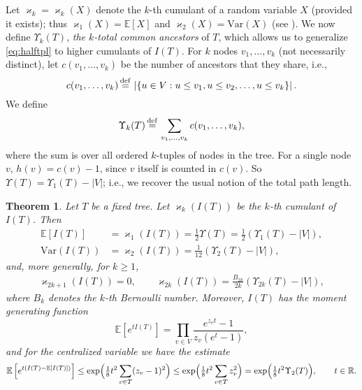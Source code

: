 \documentclass[11pt]{article}
\newcommand{\E}[1]{\mathbb{E} \left[#1\right]}
\newcommand{\Va}[1]{{\mathrm{Var}}\left(#1\right)}
\def\R{\mathbb{R}}
\def\U{\Upsilon}
\newtheorem{theorem}{Theorem}
\numberwithin{theorem}{section}
\theoremstyle{definition}
\newcommand{\eqd}{\,{\buildrel {\mathrm{def}} \over =}\,}
\numberwithin{equation}{section}
\newcommand\kk{\varkappa}
\newcommand\xpar[1]{(#1)}
\newcommand\bigpar[1]{\bigl(#1\bigr)}
\newcommand\Bigpar[1]{\Bigl(#1\Bigr)}
\begin{document}
Let $\kk_k=\kk_k(X)$ denote the $k$-th cumulant of a random variable $X$ (provided it exists); thus
$\kk_1(X)=\E X$ and $\kk_2(X)=\Va X$ (see \cite[Theorem\ 4.6.4]{g13}).  We now define \(\U_{k}(T)\),
\emph{the $k$-total common ancestors} of \(T\), which allows us to generalize \eqref{eq:halftpl} to higher
cumulants of \(I(T)\).
For \(k\) nodes $v_1, \ldots, v_k$ (not necessarily distinct), let $c(v_1, \ldots,v_k)$ be the
number of ancestors that they share, i.e.,
\[
    c(v_1,\dots,v_k) \eqd \left|
        \left\{
            u \in V: u \le v_{1}, u \le v_{2},\dots, u \le v_{k}
        \right\}
    \right|
    .
\]
We define
\begin{equation}\label{Uk}
   \Upsilon_{k}(T) \eqd \sum_{v_1,\dots,v_k} c(v_{1},\dots,v_{k}),
\end{equation}
where the sum is over all ordered $k$-tuples of nodes in the tree.  For a single node $v$, 
$h(v)=c(v)-1$, since \(v\) itself is counted in \(c(v)\). So $\U(T)=\U_1(T)-|V|$; i.e., we recover the
usual notion of the total path length.  
\begin{theorem}
    \label{thm:cumulant}
    Let $T$ be a fixed tree. 
    Let \(\kk_{k}(I(T))\) be the \(k\)-th cumulant of \(I(T)\).
    Then 
    \begin{align}
        \E{I(T)}& = \kk_{1}(I(T)) =\frac12\U(T)
        = \frac12(\U_{1}(T)-|V|), 
        \label{EIT}
        \\
        \Va{I(T)}& = \kk_{2}(I(T)) = \frac{1}{12}
        (\U_{2}(T)-|V|)
        \label{VIT},
    \end{align}
    and, more generally, for \(k \ge 1\),
    \begin{align}
        \kk_{2k+1}(I(T)) = 0,
        \qquad
        \kk_{2k}(I(T))=\frac{B_{2k}}{2k}
        (\U_{2k}(T)-|V|),
        \label{kkIT}
    \end{align}
    where \(B_k\) denotes the \(k\)-th Bernoulli number.
    Moreover, \(I(T)\) has the moment generating function
    \begin{equation}\label{mgfIT}
        \E{e^{tI(T)}}=\prod_{v\in V}\frac{e^{z_vt}-1}{z_v(e^t-1)},
    \end{equation}
and for the centralized variable  we have the estimate
    \begin{equation}\label{mgfIT*}
        \E{e^{t(I(T)-\E {I(T)})}}
        \le \exp\Bigpar{\tfrac{1}{8}t^2\sum_{v\in T}(z_v-1)^2}
        \le \exp\Bigpar{\tfrac{1}{8}t^2\sum_{v\in T}z_v^2}
        =\exp\Bigpar{\tfrac{1}{8}t^2\Upsilon_2(T)},
        \qquad t\in\R.
    \end{equation}
\end{theorem}
\end{document}

